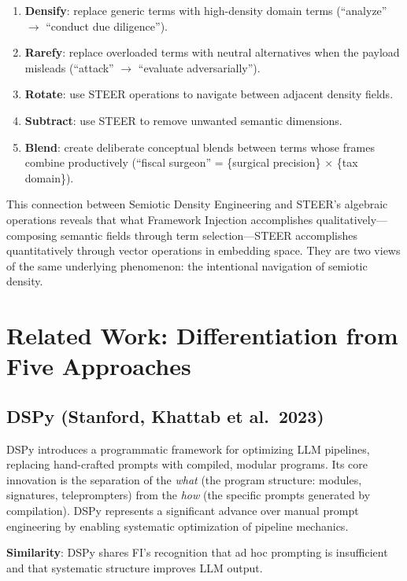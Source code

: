 \documentclass[12pt,a4paper]{article}
\begin{document}
\begin{enumerate}
    \item \textbf{Densify}: replace generic terms with high-density domain terms (``analyze'' $\to$ ``conduct due diligence'').
    \item \textbf{Rarefy}: replace overloaded terms with neutral alternatives when the payload misleads (``attack'' $\to$ ``evaluate adversarially'').
    \item \textbf{Rotate}: use STEER operations to navigate between adjacent density fields.
    \item \textbf{Subtract}: use STEER to remove unwanted semantic dimensions.
    \item \textbf{Blend}: create deliberate conceptual blends between terms whose frames combine productively (``fiscal surgeon'' = \{surgical precision\} $\times$ \{tax domain\}).
\end{enumerate}

This connection between Semiotic Density Engineering and STEER's algebraic operations reveals that what Framework Injection accomplishes qualitatively---composing semantic fields through term selection---STEER accomplishes quantitatively through vector operations in embedding space. They are two views of the same underlying phenomenon: the intentional navigation of semiotic density.


\section{Related Work: Differentiation from Five Approaches}
\label{sec:related}

\subsection{DSPy (Stanford, Khattab et al.~2023)}

DSPy \cite{khattab2023dspy} introduces a programmatic framework for optimizing LLM pipelines, replacing hand-crafted prompts with compiled, modular programs. Its core innovation is the separation of the \emph{what} (the program structure: modules, signatures, teleprompters) from the \emph{how} (the specific prompts generated by compilation). DSPy represents a significant advance over manual prompt engineering by enabling systematic optimization of pipeline mechanics.

\textbf{Similarity}: DSPy shares FI's recognition that ad hoc prompting is insufficient and that systematic structure improves LLM output.
\end{document}
